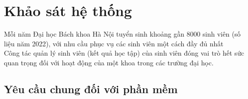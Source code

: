 \chapter{Khảo sát hệ thống}
Mỗi năm Đại học Bách khoa Hà Nội tuyển sinh khoảng gần 8000 sinh viên (số liệu năm 2022), với nhu cầu phục vụ các sinh viên một cách đầy đủ nhất\\
Công tác quản lý sinh viên (kết quả học tập) của sinh viên đóng vai trò hết sức quan trọng đối với hoạt động của một khoa trong các trường đại học.

\section{Yêu cầu chung đối với phần mềm}
